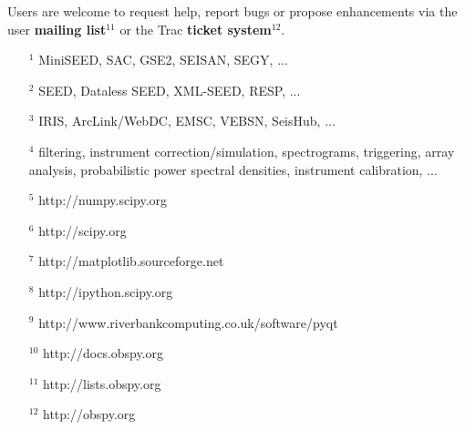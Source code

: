 \documentclass[final]{lmuposter}
\begin{document}
\begin{multicols}{3}
{Users are welcome to request help, report bugs or propose enhancements via the user \textbf{mailing list}{\small\color{blue}$^{11}$} or the Trac \textbf{ticket system}{\small\color{blue}$^{12}$}.
\begin{multicols}{2}
\small
\color{blue}
\begin{itemize}
\item[$^1$] MiniSEED, SAC, GSE2, SEISAN, SEGY, ...
\item[$^2$] SEED, Dataless SEED, XML-SEED, RESP, ...
\item[$^3$] IRIS, ArcLink/WebDC, EMSC, VEBSN, SeisHub, ...
\item[$^4$] filtering, instrument correction/simulation, spectrograms, triggering, array analysis, probabilistic power spectral densities, instrument calibration, ...
\item[$^5$] http://numpy.scipy.org
\item[$^6$] http://scipy.org
\item[$^7$] http://matplotlib.sourceforge.net
\item[$^8$] http://ipython.scipy.org
\item[$^9$] http://www.riverbankcomputing.co.uk/software/pyqt
\item[$^{10}$] http://docs.obspy.org
\item[$^{11}$] http://lists.obspy.org
\item[$^{12}$] http://obspy.org
\end{itemize}
\end{multicols}
}\vspace{0.4\MyBoxVSep}


\vspace{0.4\MyBoxVSep}

\MyBox[8em]{
}
\end{multicols}
\end{document}
